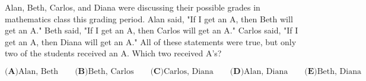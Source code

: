 

Alan, Beth, Carlos, and Diana were discussing their possible grades in mathematics class this grading period. Alan said, "If I get an A, then Beth will get an A." Beth said, "If I get an A, then Carlos will get an A." Carlos said, "If I get an A, then Diana will get an A." All of these statements were true, but only two of the students received an A. Which two received A's?

\[ \textbf{(A)} \text{Alan, Beth} \qquad
\textbf{(B)} \text{Beth, Carlos} \qquad
\textbf{(C)} \text{Carlos, Diana} \qquad
\textbf{(D)} \text{Alan, Diana} \qquad
\textbf{(E)} \text{Beth, Diana}
\]
